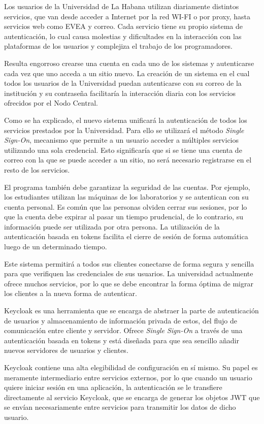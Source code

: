 Los usuarios de la Universidad de La Habana  utilizan diariamente distintos servicios, que van desde acceder a Internet por la red WI-FI o por proxy, hasta servicios web como EVEA y correo. Cada servicio tiene su propio sistema de autenticación, lo cual causa molestias y dificultades en la interacción con las plataformas de los usuarios y complejiza el trabajo de los programadores.

Resulta engorroso crearse una cuenta en cada uno de los sistemas y autenticarse cada vez que uno acceda a un sitio nuevo. La creación de un sistema en el cual todos los usuarios de la Universidad puedan autenticarse con su correo de la institución y su contraseña facilitaría la interacción diaria con los servicios ofrecidos por el Nodo Central.


Como se ha explicado, el nuevo sistema unificará la autenticación de todos los servicios prestados por la Universidad. Para ello se utilizará el método \textit{Single Sign-On}, mecanismo que permite a un usuario acceder a múltiples servicios utilizando una sola credencial. Esto significaría que si se tiene una cuenta de correo con la que se puede acceder a un sitio, no será necesario registrarse en el resto de los servicios.

El programa también debe garantizar la seguridad de las cuentas. Por ejemplo, los estudiantes utilizan las máquinas de los laboratorios y se autentican con su cuenta personal. Es común que las personas olviden cerrar sus sesiones, por lo que la cuenta debe expirar al pasar un tiempo prudencial, de lo contrario, su información puede ser utilizada por otra persona. La utilización de la autenticación basada en tokens facilita el cierre de sesión de forma automática luego de un determinado tiempo.

Este sistema permitirá a todos sus clientes conectarse de forma segura y sencilla para que verifiquen las credenciales de sus usuarios. La universidad actualmente ofrece muchos servicios, por lo que se debe encontrar la forma óptima de migrar los clientes a la nueva forma de autenticar.

Keycloak es una herramienta que se encarga de abstraer la parte de autenticación de usuarios y almacenamiento de información privada de estos, del flujo de comunicación entre cliente y servidor. Ofrece \textit{Single Sign-On} a través de una autenticación basada en tokens y está diseñada para que sea sencillo añadir nuevos servidores de usuarios y clientes.

Keycloak contiene una alta elegibilidad de configuración en sí mismo. Su papel es meramente intermediario entre servicios externos, por lo que cuando un usuario quiere iniciar sesión en una aplicación, la autenticación se le transfiere directamente al servicio Keycloak, que se encarga de generar los objetos JWT que se envían necesariamente entre servicios para transmitir los datos de dicho usuario.

